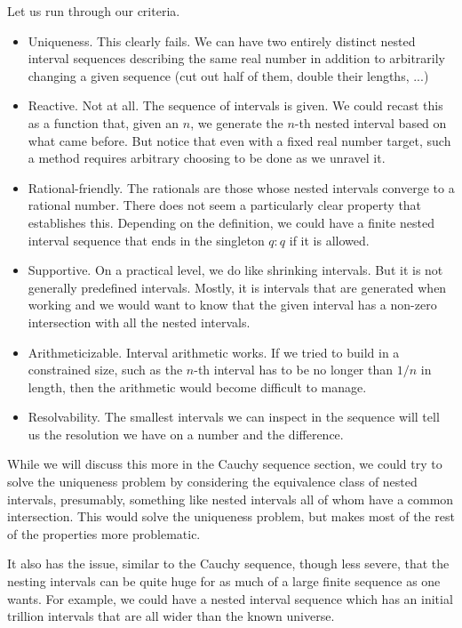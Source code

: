\documentclass[12pt]{article}
\theoremstyle{remark}
\begin{document}
Let us run through our criteria. 

\begin{itemize}
    \item Uniqueness. This clearly fails. We can have two entirely distinct nested interval sequences describing the same real number in addition to arbitrarily changing a given sequence (cut out half of them, double their lengths, ...)
    \item Reactive. Not at all. The sequence of intervals is given. We could recast this as a function that, given an $n$, we generate the $n$-th nested interval based on what came before. But notice that even with a fixed real number target, such a method requires arbitrary choosing to be done as we unravel it.
    \item Rational-friendly. The rationals are those whose nested intervals converge to a rational number. There does not seem a particularly clear property that establishes this. Depending on the definition, we could have a finite nested interval sequence that ends in the singleton $q:q$ if it is allowed. 
    \item Supportive. On a practical level, we do like shrinking intervals. But it is not generally predefined intervals. Mostly, it is intervals that are generated when working and we would want to know that the given interval has a non-zero intersection with all the nested intervals. 
    \item Arithmeticizable. Interval arithmetic works. If we tried to build in a constrained size, such as the $n$-th interval has to be no longer than $1/n$ in length, then the arithmetic would become difficult to manage. 
    \item Resolvability. The smallest intervals we can inspect in the sequence will tell us the resolution we have on a number and the difference. 
\end{itemize}

While we will discuss this more in the Cauchy sequence section, we could try to solve the uniqueness problem by considering the equivalence class of nested intervals, presumably, something like nested intervals all of whom have a common intersection. This would solve the uniqueness problem, but makes most of the rest of the properties more problematic. 

It also has the issue, similar to the Cauchy sequence, though less severe, that the nesting intervals can be quite huge for as much of a large finite sequence as one wants. For example, we could have a nested interval sequence which has an initial trillion intervals that are all wider than the known universe. 
\end{document}
